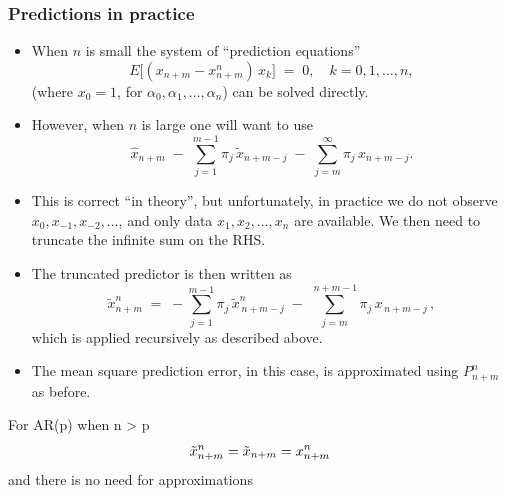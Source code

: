 \documentclass{article}
\begin{document}
\subsubsection{Predictions in practice}
\begin{itemize}
  \item When \(n\) is small the system of “prediction equations”
    \begin{equation*}
      E\bigl[(x_{n+m} - x_{n+m}^n)\,x_k\bigr] \;=\; 0, 
      \quad k = 0,1,\dots,n,
    \end{equation*}
    (where \(x_0 = 1\), for \(\alpha_0, \alpha_1, \dots, \alpha_n\)) can be solved directly.
  
  \item However, when \(n\) is large one will want to use
    \begin{equation*}
      \hat{x}_{n+m}
      \;-\; \sum_{j=1}^{m-1} \pi_{j}\,\tilde{x}_{n+m-j}
      \;-\; \sum_{j=m}^{\infty} \pi_{j}\,x_{n+m-j}.
    \end{equation*}
    \item This is correct “in theory”, but unfortunately, in practice we do not observe \(x_0, x_{-1}, x_{-2}, \dots\), and only data \(x_1, x_2, \dots, x_n\) are available. We then need to truncate the infinite sum on the RHS.
\end{itemize}


\begin{itemize}
  \item The truncated predictor is then written as
    \begin{equation*}
      \widetilde{x}_{n+m}^n \;=\; 
      -\sum_{j=1}^{m-1} \pi_{j}\,\widetilde{x}_{\,n+m-j}^n 
      \;-\; 
      \sum_{j=m}^{\,n+m-1} \pi_{j}\,x_{\,n+m-j}\,,
    \end{equation*}
    which is applied recursively as described above.
  \item The mean square prediction error, in this case, is approximated using \(P^n_{n+m}\) as before.
\end{itemize}


For AR(p) when n > p
\begin{equation*}
    \tilde{x}_{n+m}^n = \Tilde{x}_{n+m} = x_{n+m}^n
\end{equation*}
and there is no need for approximations
\end{document}
